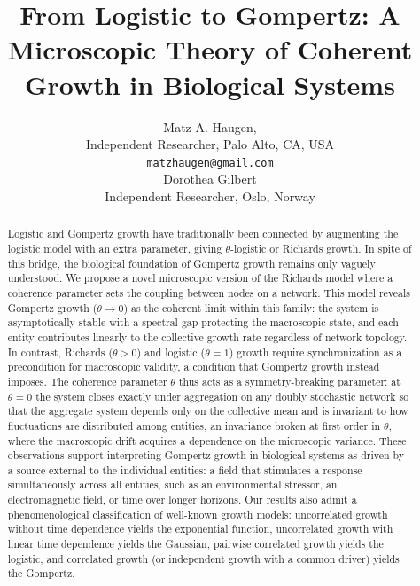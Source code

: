 \documentclass{article}
\title{From Logistic to Gompertz: A Microscopic Theory of Coherent Growth in Biological Systems}
\author{Matz A. Haugen, \\
Independent Researcher, Palo Alto, CA, USA\\
\texttt{matzhaugen@gmail.com} \\
  \And
  Dorothea Gilbert \\
  Independent Researcher, Oslo, Norway\\
}
\begin{document}
\maketitle

\begin{abstract}
Logistic and Gompertz growth have traditionally been connected by augmenting the logistic model with an extra parameter, giving $\theta$-logistic or Richards growth. In spite of this bridge, the biological foundation of Gompertz growth remains only vaguely understood.
We propose a novel microscopic version of the Richards model where a coherence parameter sets the coupling between nodes on a network.
This model reveals Gompertz growth ($\theta \to 0$) as the coherent limit within this family: the system is asymptotically stable with a spectral gap protecting the macroscopic state, and each entity contributes linearly to the collective growth rate regardless of network topology.
In contrast, Richards ($\theta > 0$) and logistic ($\theta = 1$) growth require synchronization as a precondition for macroscopic validity, a condition that Gompertz growth instead imposes.
The coherence parameter $\theta$ thus acts as a symmetry-breaking parameter: at $\theta = 0$ the system closes exactly under aggregation on any doubly stochastic network so that the aggregate system depends only on the collective mean and is invariant to how fluctuations are distributed among entities, an invariance broken at first order in $\theta$, where the macroscopic drift acquires a dependence on the microscopic variance.
These observations support interpreting Gompertz growth in biological systems as driven by a source external to the individual entities: a field that stimulates a response simultaneously across all entities, such as an environmental stressor, an electromagnetic field, or time over longer horizons.
Our results also admit a phenomenological classification of well-known growth models: uncorrelated growth without time dependence yields the exponential function, uncorrelated growth with linear time dependence yields the Gaussian, pairwise correlated growth yields the logistic, and correlated growth (or independent growth with a common driver) yields the Gompertz.
\end{abstract}

\end{document}
